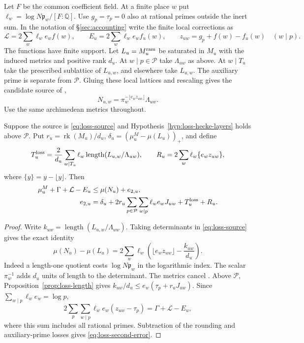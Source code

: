 Let $F$ be the common coefficient field. At a finite place $w$ put
$\ell_w=\log N\mathfrak p_w/[F:\mathbb Q]$. Use $g_p=\tau_p=0$
also at rational primes outside the inert sum. In the notation of
\S\ref{sec:accounting} write the finite local corrections as
\[
 \mathcal L=2\sum_w\ell_we_w f(w),\qquad
 E_u=2\sum_w\ell_we_w f_u(w),\qquad
 z_{uw}=g_p+f(w)-f_u(w)\quad(w\mid p).
\]
The functions have finite support. Let $L_u=M_u^{\rm ram}$ be saturated
in $M_u$ with the induced metrics and positive rank $d_u$.
At $w\mid p\in\mathcal P$ take $\Lambda_{uw}$ as above. At $w\mid T_u$ take
the prescribed sublattice of $L_{u,w}$, and elsewhere take $L_{u,w}$.
The auxiliary prime is separate from $\mathcal P$.
Gluing these local lattices and rescaling gives the candidate source
of \citep[Definition~12.20]{adriazola-grh},
\begin{equation}\label{eq:loss-source}
       N_{u,w}=\pi_w^{-\lfloor e_w z_{uw}\rfloor}\Lambda_{uw}.
\end{equation}
Use the same archimedean metrics throughout.

\begin{theorem}\label{thm:loss-source}
Suppose the source is \eqref{eq:loss-source} and
Hypothesis~\ref{hyp:loss-hecke-layers} holds above $\mathcal P$.
Put $r_u=\operatorname{rk}(M_u)/d_u$, $\delta_u=(\mu^M_u-\mu(L_u))_+$,
and define
\[
 T^{\rm loss}_u=\frac2{d_u}\sum_{w\mid T_u}\ell_w
       \operatorname{length}(L_{u,w}/\Lambda_{uw}),\qquad
 R_u=2\sum_w\ell_w\{e_w z_{uw}\},
\]
where $\{y\}=y-\lfloor y\rfloor$. Then
\begin{align}
 \mu^M_u+\Gamma+\mathcal L-E_u&\le\mu(N_u)+e_{2,u},
       \label{eq:loss-second-error}\\
 e_{2,u}&=\delta_u+2r_u\sum_{p\in\mathcal P}\sum_{w\mid p}
        \ell_we_w J_{uw}+T^{\rm loss}_u+R_u .\notag
\end{align}
\end{theorem}

\begin{proof}
Write $k_{uw}=\operatorname{length}(L_{u,w}/\Lambda_{uw})$.
Taking determinants in \eqref{eq:loss-source} gives the exact identity
\[
 \mu(N_u)-\mu(L_u)=
     2\sum_w\ell_w\left(\lfloor e_w z_{uw}\rfloor-\frac{k_{uw}}{d_u}\right).
\]
Indeed a length-one quotient costs $\log N\mathfrak p_w$ in the
logarithmic index. The scalar $\pi_w^{-1}$ adds $d_u$ units of length
to the determinant. The metrics cancel \citep[Lemma~12.19]{adriazola-grh}.
Above $\mathcal P$, Proposition~\ref{prop:loss-length} gives
$k_{uw}/d_u\le e_w(\tau_p+r_uJ_{uw})$.
Since $\sum_{w\mid p}\ell_w e_w=\log p$,
\[
 2\sum_{p}\sum_{w\mid p}\ell_we_w(z_{uw}-\tau_p)
       =\Gamma+\mathcal L-E_u ,
\]
where this sum includes all rational primes. Subtraction of the
rounding and auxiliary-prime losses gives \eqref{eq:loss-second-error}.
\end{proof}

